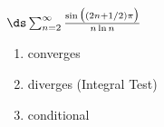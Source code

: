 {$\ds \sum_{n=2}^\infty \frac{\sin\big((2n+1/2)\pi\big)}{n\ln n}$
}
{\begin{enumerate}
	\item converges
	\item	diverges (Integral Test)
	\item conditional
\end{enumerate}
}